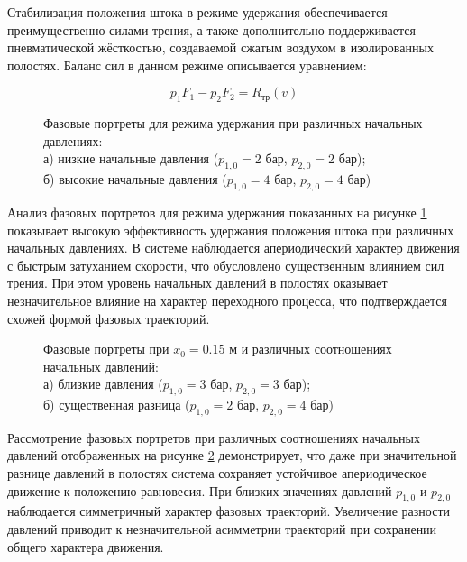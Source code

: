 Стабилизация положения штока в режиме удержания обеспечивается преимущественно силами трения, а также дополнительно
поддерживается пневматической жёсткостью, создаваемой сжатым воздухом в изолированных полостях. Баланс сил в данном режиме описывается уравнением:

\begin{equation}
	p_1F_1 - p_2F_2 = R_\text{тр}(v)
\end{equation}

\begin{figure}[htbp]
	\caption{Фазовые портреты для режима удержания при различных начальных давлениях:\\
		а) низкие начальные давления ($p_{1,0} = 2$ бар, $p_{2,0} = \num{2}$ бар);\\
		б) высокие начальные давления ($p_{1,0} = 4$ бар, $p_{2,0} = \num{4}$ бар)}
	\label{fig:pp_hold_mode}
\end{figure}

Анализ фазовых портретов для режима удержания показанных на рисунке \ref{fig:pp_hold_mode} показывает высокую эффективность удержания положения штока при различных начальных давлениях.
В системе наблюдается апериодический характер движения с быстрым затуханием скорости, что обусловлено существенным влиянием сил трения.
При этом уровень начальных давлений в полостях оказывает незначительное влияние на характер переходного процесса, что подтверждается схожей формой фазовых траекторий.

\begin{figure}[htbp]
	\caption{Фазовые портреты при $x_0 = \num{0.15}$ м и различных соотношениях начальных давлений:\\
		а) близкие давления ($p_{1,0} = 3$ бар, $p_{2,0} = 3$ бар);\\
		б) существенная разница ($p_{1,0} = 2$ бар, $p_{2,0} = 4$ бар)}
	\label{fig:pp_hold_matrix}
\end{figure}

Рассмотрение фазовых портретов при различных соотношениях начальных давлений отображенных на  рисунке \ref{fig:pp_hold_matrix} демонстрирует,
что даже при значительной разнице давлений в полостях система сохраняет устойчивое апериодическое движение к положению равновесия.
При близких значениях давлений $p_{1,0}$ и $p_{2,0}$ наблюдается симметричный характер фазовых траекторий. Увеличение разности давлений приводит к незначительной асимметрии траекторий при сохранении общего характера движения.

